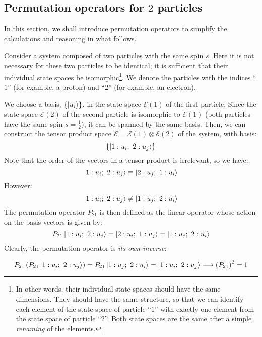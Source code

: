 \subsection{Permutation operators for $2$ particles}

In this section, we shall introduce permutation operators to simplify the calculations and reasoning in what follows.

Consider a system composed of two particles with the same spin $s$. Here it is not necessary for these two particles to be identical; it is sufficient that their individual state spaces be isomorphic\footnote{In other words, their individual state spaces should have the same dimensions. They should have the same structure, so that we can identify each element of the state space of particle ``$1$'' with exactly one element from the state space of particle ``$2$''. Both state spaces are the same after a simple \textit{renaming} of the elements.}. We denote the particles with the indices ``$1$'' (for example, a proton) and ``$2$'' (for example, an electron).

We choose a basis, $\{\ket{u_i}\}$, in the state space $\mathcal{E}(1)$ of the first particle. Since the state space $\mathcal{E}(2)$ of the second particle is isomorphic to $\mathcal{E}(1)$ (both particles have the same spin $s = \frac{1}{2}$), it can be spanned by the same basis. Then, we can construct the tensor product space $\mathcal{E} = \mathcal{E}(1) \otimes \mathcal{E}(2)$ of the system, with basis:
\begin{equation}
    \{\ket{1:u_i;\ 2: u_j}\}
\end{equation}
Note that the order of the vectors in a tensor product is irrelevant, so we have:
\begin{equation}
    \ket{1:u_i;\ 2: u_j} \equiv \ket{2:u_j;\ 1: u_i}
\end{equation}
However:
\begin{equation}
    \ket{1:u_i;\ 2: u_j} \neq \ket{1:u_j;\ 2: u_i}
\end{equation}
The permutation operator $P_{21}$ is then defined as the linear operator whose action on the basis vectors is given by:
\begin{equation}
    P_{21}\ket{1:u_i;\ 2: u_j} = \ket{2:u_i;\ 1: u_j} = \ket{1: u_j;\ 2:u_i}
\end{equation} 
Clearly, the permutation operator is \textit{its own inverse}:

\begin{equation}
    P_{21}\left(P_{21}\ket{1:u_i;\ 2: u_j}\right) = P_{21}\ket{1: u_j;\ 2:u_i} = \ket{1:u_i;\ 2: u_j} \longrightarrow \left(P_{21}\right)^2 = 1
\end{equation} 

